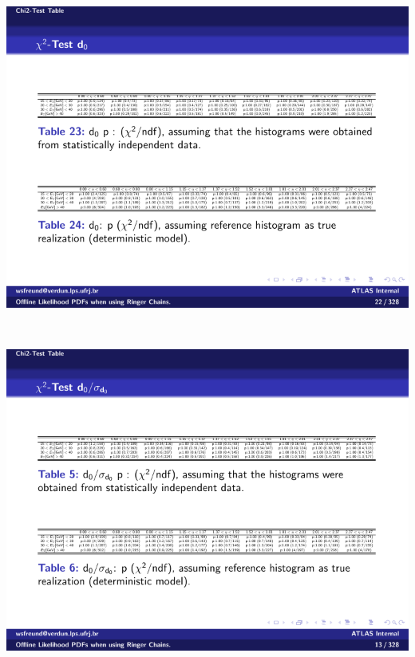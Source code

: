 \begin{table}[t]
\begin{subtable}{\textwidth}
\caption{\trackdO{}\label{tab:gof_chi2_p_values_d0}}
\includegraphics[width=\textwidth]{appendices/figures/gof/d0_chi2_table.pdf}
\end{subtable} \\
\begin{subtable}{\textwidth}
\caption{\dOSignificance{}\label{tab:gof_chi2_p_values_d0sig}}
\includegraphics[width=\textwidth]{appendices/figures/gof/d0sig_chi2_table}
\end{subtable} \\
\end{table}

